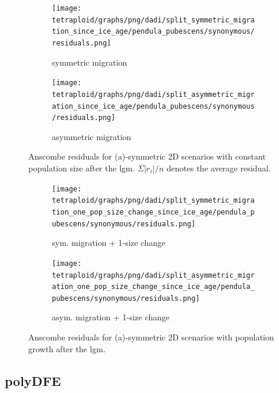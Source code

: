 \documentclass[hidelinks,11pt]{article}
\begin{document}
    \begin{figure}[H]
        \centering
        \begin{subfigure}[b]{0.49\textwidth}
            \texttt{[image: tetraploid/graphs/png/dadi/split\_symmetric\_migration\_since\_ice\_age/pendula\_pubescens/synonymous/residuals.png]}
            \caption{symmetric migration}
            \label{fig:constant_pop_size}
        \end{subfigure}
        \hfill
        \begin{subfigure}[b]{0.49\textwidth}
            \texttt{[image: tetraploid/graphs/png/dadi/split\_asymmetric\_migration\_since\_ice\_age/pendula\_pubescens/synonymous/residuals.png]}
            \caption{asymmetric migration}
            \label{fig:one_pop_size_change}
        \end{subfigure}
        \caption{Anscombe residuals for (a)-symmetric 2D scenarios with constant population size after the \acrshort{lgm}. $\Sigma |r_i|/n$ denotes the average residual.}
        \label{fig:dadi_2d_residuals_constant_size_fixed_time}
    \end{figure}

    \begin{figure}[H]
        \centering
        \begin{subfigure}[b]{0.49\textwidth}
            \texttt{[image: tetraploid/graphs/png/dadi/split\_symmetric\_migration\_one\_pop\_size\_change\_since\_ice\_age/pendula\_pubescens/synonymous/residuals.png]}
            \caption{sym. migration + 1-size change}
            \label{fig:two_pop_size_change_since_ice_age_sym}
        \end{subfigure}
        \hfill
        \begin{subfigure}[b]{0.49\textwidth}
            \texttt{[image: tetraploid/graphs/png/dadi/split\_asymmetric\_migration\_one\_pop\_size\_change\_since\_ice\_age/pendula\_pubescens/synonymous/residuals.png]}
            \caption{asym. migration + 1-size change}
            \label{fig:two_pop_size_change_since_ice_age_asym}
        \end{subfigure}
        \caption{Anscombe residuals for (a)-symmetric 2D scenarios with population growth after the \acrshort{lgm}.}
        \label{fig:dadi_2d_residuals_growth_fixed_time}
    \end{figure}

    \clearpage

    \subsection{polyDFE}
    \label{sec:appendix-polydfe}
    
\end{document}
